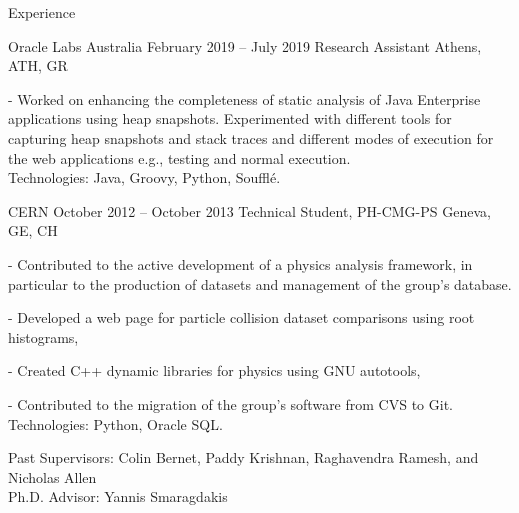 \documentclass{resume}
\begin{document}
\begin{rSection}{Experience}
\begin{rSubsection}
  {Oracle Labs Australia}
  {February 2019 -- July 2019}
  {Research Assistant}
  {Athens, ATH, GR}
    \item[-] Worked on enhancing the completeness of static analysis of Java Enterprise applications using heap snapshots. Experimented with different tools for capturing heap snapshots and stack traces and different modes of execution for the web applications e.g., testing and normal execution.
    \\
\footnotesize\textcolor{TechsColor}{Technologies: Java, Groovy, Python, Soufflé.}\\
\end{rSubsection}


\begin{rSubsection}
  {CERN}
  {October 2012 -- October 2013}
  {Technical Student, PH-CMG-PS}
  {Geneva, GE, CH}
    \item[-] Contributed to the active development of a physics analysis framework, in particular to the production of datasets and management of the group's database.
    \item[-] Developed a web page for particle collision dataset comparisons using root histograms,
    \item[-] Created C++ dynamic libraries for physics using GNU autotools,
    \item[-] Contributed to the migration of the group's software from CVS to Git.
    \\
  \footnotesize\textcolor{TechsColor}{Technologies: Python, Oracle SQL.}\\
\end{rSubsection}
  Past Supervisors: Colin Bernet, Paddy Krishnan, Raghavendra Ramesh, and Nicholas Allen \\
  Ph.D. Advisor: Yannis Smaragdakis
\end{rSection}
\end{document}
